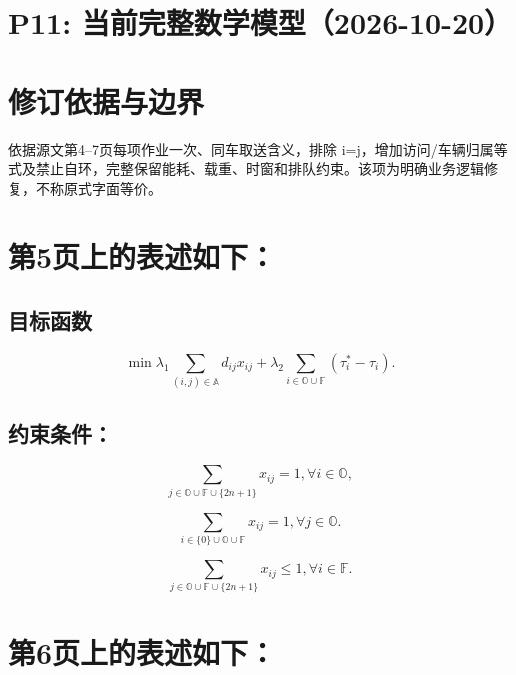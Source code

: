 \documentclass[11pt]{ctexart}
\begin{document}
\section*{P11: 当前完整数学模型（2026-10-20）}
\section*{修订依据与边界}依据源文第4–7页每项作业一次、同车取送含义，排除 i=j，增加访问/车辆归属等式及禁止自环，完整保留能耗、载重、时窗和排队约束。该项为明确业务逻辑修复，不称原式字面等价。




\section{第5页上的表述如下：}

\subsection{目标函数}
\begin{equation}
    \label{eq:1}
    \min \lambda_1 \sum_{(i,j) \in \mathbb{A}} d_{ij}x_{ij} + \lambda_2 \sum_{i \in \mathbb{O} \cup \mathbb{F}} (\tau_i^* - \tau_i). \tag{1}
\end{equation}

\subsection{约束条件：}
\begin{equation}
    \label{eq:2}
    \sum_{j \in \mathbb{O} \cup \mathbb{F} \cup \{2n+1\}} x_{ij} = 1, \forall i \in \mathbb{O}, \tag{2}
\end{equation}

\begin{equation}
    \label{eq:3}
    \sum_{i \in \{0\} \cup \mathbb{O} \cup \mathbb{F}} x_{ij} = 1, \forall j \in \mathbb{O}. \tag{3}
\end{equation}

\begin{equation}
    \label{eq:4}
    \sum_{j \in \mathbb{O} \cup \mathbb{F} \cup \{2n+1\}} x_{ij} \le 1, \forall i \in \mathbb{F}. \tag{4}
\end{equation}

\newpage

\section{第6页上的表述如下：}
\end{document}
